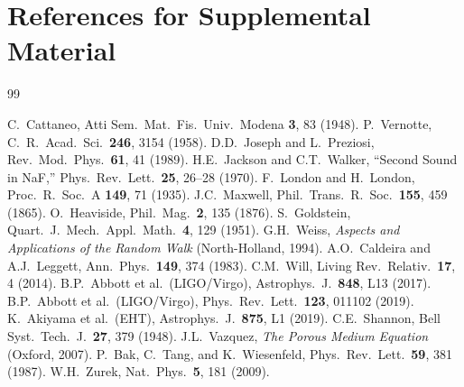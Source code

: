 \documentclass[reprint]{revtex4-2}
\begin{document}
\section*{References for Supplemental Material}

\begin{thebibliography}{99}

 C.~Cattaneo, Atti Sem.\ Mat.\ Fis.\ Univ.\ Modena \textbf{3}, 83 (1948).
 P.~Vernotte, C.\ R.\ Acad.\ Sci.\ \textbf{246}, 3154 (1958).
 D.D.\ Joseph and L.\ Preziosi, Rev.\ Mod.\ Phys.\ \textbf{61}, 41 (1989).
 H.E.\ Jackson and C.T.\ Walker, ``Second Sound in NaF,'' Phys.\ Rev.\ Lett.\ \textbf{25}, 26--28 (1970).
 F.\ London and H.\ London, Proc.\ R.\ Soc.\ A \textbf{149}, 71 (1935).
 J.C.\ Maxwell, Phil.\ Trans.\ R.\ Soc.\ \textbf{155}, 459 (1865).
 O.\ Heaviside, Phil.\ Mag.\ \textbf{2}, 135 (1876).
 S.~Goldstein, Quart.\ J.\ Mech.\ Appl.\ Math.\ \textbf{4}, 129 (1951).
 G.H.\ Weiss, \emph{Aspects and Applications of the Random Walk} (North-Holland, 1994).
 A.O.\ Caldeira and A.J.\ Leggett, Ann.\ Phys.\ \textbf{149}, 374 (1983).
 C.M.\ Will, Living Rev.\ Relativ.\ \textbf{17}, 4 (2014).
 B.P.\ Abbott et al.\ (LIGO/Virgo), Astrophys.\ J.\ \textbf{848}, L13 (2017).
 B.P.\ Abbott et al.\ (LIGO/Virgo), Phys.\ Rev.\ Lett.\ \textbf{123}, 011102 (2019).
 K.~Akiyama et al.\ (EHT), Astrophys.\ J.\ \textbf{875}, L1 (2019).
 C.E.\ Shannon, Bell Syst.\ Tech.\ J.\ \textbf{27}, 379 (1948).
 J.L.\ Vazquez, \emph{The Porous Medium Equation} (Oxford, 2007).
 P.~Bak, C.~Tang, and K.~Wiesenfeld, Phys.\ Rev.\ Lett.\ \textbf{59}, 381 (1987).
 W.H.\ Zurek, Nat.\ Phys.\ \textbf{5}, 181 (2009).
\end{thebibliography}
\end{document}
